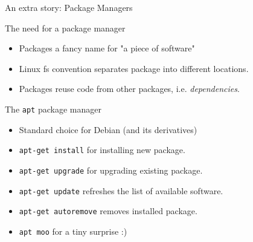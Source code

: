 \begin{frame}{An extra story: Package Managers}
\begin{block}{The need for a package manager}
	\begin{itemize}
		\item Packages a fancy name for "a piece of software"
		\item Linux fs convention separates package into different locations.
		\item Packages reuse code from other packages, i.e. \textit{dependencies}.
	\end{itemize}
\end{block}
\begin{block}{The \texttt{apt} package manager}
	\begin{itemize}
		\item Standard choice for Debian (and its derivatives)
		\item \texttt{apt-get install} for installing new package.
		\item \texttt{apt-get upgrade} for upgrading existing package.
		\item \texttt{apt-get update} refreshes the list of available software.
		\item \texttt{apt-get autoremove} removes installed package.
		\item \texttt{apt moo} for a tiny surprise :)
	\end{itemize}
\end{block}
\end{frame}

